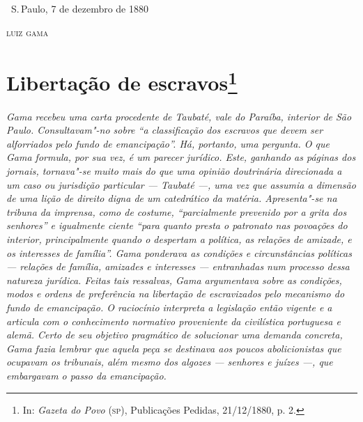 \bigskip

\hfill\ S.\,Paulo, 7 de dezembro de 1880\smallskip

\hfill\textsc{luiz gama}

\chapter{Libertação de escravos\footnote[*]{
  In: \emph{Gazeta do Povo} (\textsc{sp}), Publicações Pedidas, 21/12/1880, p. 2.}}

\begin{flushleft}
{\footnotesize\itshape
Gama recebeu uma carta procedente de Taubaté, vale do Paraíba,
interior de São Paulo. Consultavam"-no sobre ``a classificação dos
escravos que devem ser alforriados pelo fundo de emancipação''. Há,
portanto, uma pergunta. O que Gama formula, por sua vez, é um parecer
jurídico. Este, ganhando as páginas dos jornais, tornava"-se muito mais
do que uma opinião doutrinária direcionada a um caso ou jurisdição
particular --- Taubaté ---, uma vez que assumia a dimensão de uma lição de
direito digna de um catedrático da matéria. Apresenta"-se na tribuna da
imprensa, como de costume, ``parcialmente prevenido por a grita dos
senhores'' e igualmente ciente ``para quanto presta o patronato nas
povoações do interior, principalmente quando o despertam a política, as
relações de amizade, e os interesses de família''. Gama ponderava as
condições e circunstâncias políticas --- relações de
família, amizades e interesses --- entranhadas num processo dessa
natureza jurídica. Feitas tais ressalvas, Gama argumentava sobre as condições, modos
e ordens de preferência na libertação de escravizados pelo mecanismo do
fundo de emancipação. O raciocínio interpreta a legislação então vigente
e a articula com o conhecimento normativo proveniente da civilística portuguesa e alemã.
Certo de seu objetivo pragmático de solucionar uma demanda concreta,
Gama fazia lembrar que aquela peça se destinava aos poucos abolicionistas que
ocupavam os tribunais, além mesmo dos algozes --- senhores e juízes ---,
que embargavam o passo da emancipação.} %
\end{flushleft}

